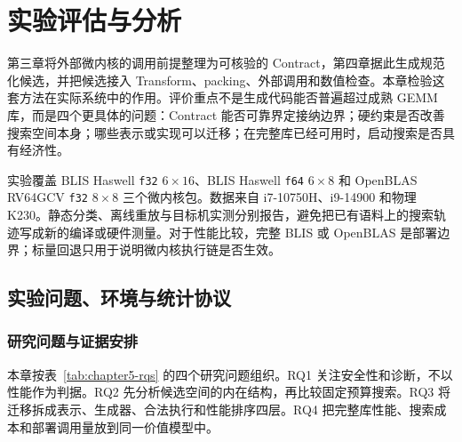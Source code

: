 
\chapter{实验评估与分析}
\label{chap:evaluation}

第三章将外部微内核的调用前提整理为可核验的 Contract，第四章据此生成规范化候选，并把候选接入 Transform、packing、外部调用和数值检查。本章检验这套方法在实际系统中的作用。评价重点不是生成代码能否普遍超过成熟 GEMM 库，而是四个更具体的问题：Contract 能否可靠界定接纳边界；硬约束是否改善搜索空间本身；哪些表示或实现可以迁移；在完整库已经可用时，启动搜索是否具有经济性。

实验覆盖 BLIS Haswell \texttt{f32} $6\times16$、BLIS Haswell \texttt{f64} $6\times8$ 和 OpenBLAS RV64GCV \texttt{f32} $8\times8$ 三个微内核包。数据来自 i7-10750H、i9-14900 和物理 K230。静态分类、离线重放与目标机实测分别报告，避免把已有语料上的搜索轨迹写成新的编译或硬件测量。对于性能比较，完整 BLIS 或 OpenBLAS 是部署边界；标量回退只用于说明微内核执行链是否生效。

\section{实验问题、环境与统计协议}

\subsection{研究问题与证据安排}

本章按表~\ref{tab:chapter5-rqs} 的四个研究问题组织。RQ1 关注安全性和诊断，不以性能作为判据。RQ2 先分析候选空间的内在结构，再比较固定预算搜索。RQ3 将迁移拆成表示、生成器、合法执行和性能排序四层。RQ4 把完整库性能、搜索成本和部署调用量放到同一价值模型中。

